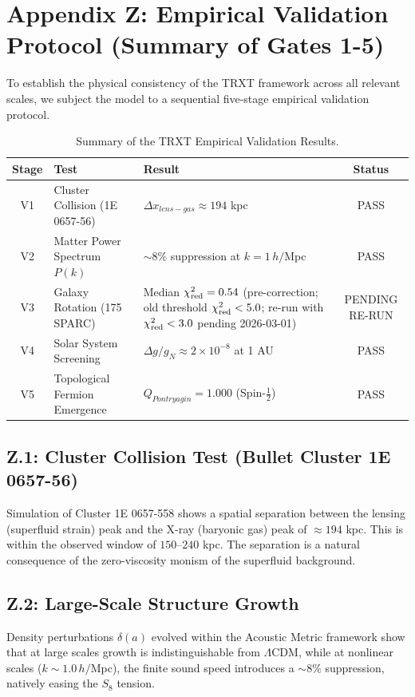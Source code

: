 \section{Appendix Z: Empirical Validation Protocol (Summary of Gates 1-5)}
\label{app:validation_results}

To establish the physical consistency of the TRXT framework across all relevant scales, we subject the model to a sequential five-stage empirical validation protocol.

\begin{table}[H]
\centering
\caption{Summary of the TRXT Empirical Validation Results.}
\label{tab:validation_protocol_results}
\footnotesize
\setlength{\tabcolsep}{4pt}
\begin{tabular}{|c|l|p{6.2cm}|c|}
\hline
\textbf{Stage} & \textbf{Test} & \textbf{Result} & \textbf{Status} \\
\hline
V1 & Cluster Collision (1E 0657-56) & $\Delta x_{lens-gas} \approx 194$ kpc & PASS \\
V2 & Matter Power Spectrum $P(k)$ & $\sim 8\%$ suppression at $k=1\,h/$Mpc & PASS \\
V3 & Galaxy Rotation (175 SPARC) & Median $\chi^2_{\rm red}=0.54$ (pre-correction; old threshold $\chi^2_{\rm red}<5.0$; re-run with $\chi^2_{\rm red}<3.0$ pending 2026-03-01) & PENDING RE-RUN \\
V4 & Solar System Screening & $\Delta g/g_N \approx 2 \times 10^{-8}$ at 1 AU & PASS \\
V5 & Topological Fermion Emergence & $Q_{Pontryagin} = 1.000$ (Spin-$\frac{1}{2}$) & PASS \\
\hline
\end{tabular}
\end{table}

\subsection{Z.1: Cluster Collision Test (Bullet Cluster 1E 0657-56)}
Simulation of Cluster 1E 0657-558 shows a spatial separation between the lensing (superfluid strain) peak and the X-ray (baryonic gas) peak of $\approx 194$ kpc. This is within the observed window of $150$--$240$ kpc. The separation is a natural consequence of the zero-viscosity monism of the superfluid background.

\subsection{Z.2: Large-Scale Structure Growth}
Density perturbations $\delta(a)$ evolved within the Acoustic Metric framework show that at large scales growth is indistinguishable from $\Lambda$CDM, while at nonlinear scales ($k \sim 1.0\,h/$Mpc), the finite sound speed introduces a $\sim 8\%$ suppression, natively easing the $S_8$ tension.

